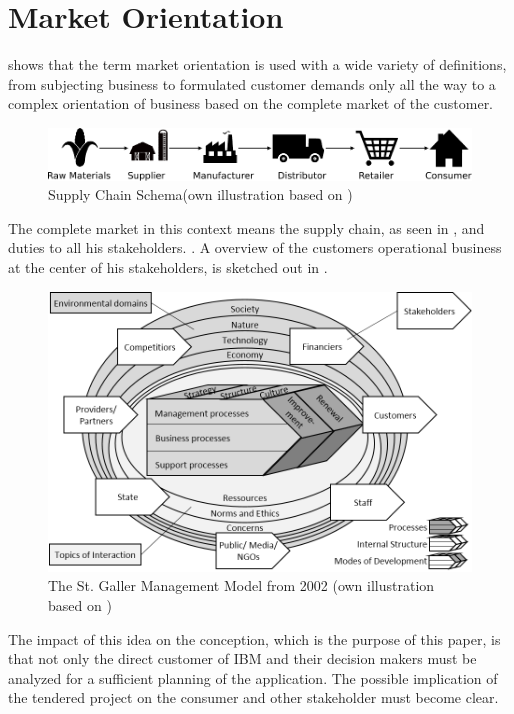 \section{Market Orientation}
\textcite[9-10]{Claen.2016} shows that the term market orientation is used with a wide variety of definitions, from subjecting business to formulated customer demands only all the way to a complex orientation of business based on the complete market of the customer.
\begin{figure}[H]
	\includegraphics[width=\textwidth]{img/supplychain.pdf}
	\caption[Supply Chain Schema]{Supply Chain Schema(own illustration based on \protect\cite{SouthwestTech})}
    	\label{fig:supplychain}
\end{figure}
The complete market in this context means the supply chain, as seen in , and duties to all his stakeholders. \parencite[cf.][22-23]{Claen.2016}. A overview of the customers operational business at the center of his stakeholders, is sketched out in .
\begin{figure}[H]
	\includegraphics[width=1\textwidth]{img/SGM.png}
	\caption[St. Galler Management Modell]{The St. Galler Management Model from 2002 (own illustration based on \protect\cite{RueggSturm.2003})}
	\label{fig:SGM}
\end{figure}
The impact of this idea on the conception, which is the purpose of this paper, is that not only the direct customer of IBM and their decision makers must be analyzed for a sufficient planning of the application. The possible implication of the tendered project on the consumer and other stakeholder must become clear.
